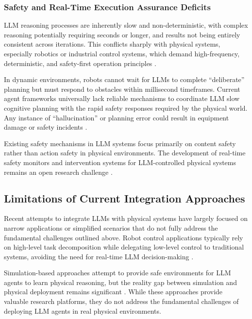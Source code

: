 \subsubsection{Safety and Real-Time Execution Assurance Deficits}

LLM reasoning processes are inherently slow and non-deterministic, with complex reasoning potentially requiring seconds or longer, and results not being entirely consistent across iterations. This conflicts sharply with physical systems, especially robotics or industrial control systems, which demand high-frequency, deterministic, and safety-first operation principles \cite{thrun2002probabilistic}.

In dynamic environments, robots cannot wait for LLMs to complete ``deliberate'' planning but must respond to obstacles within millisecond timeframes. Current agent frameworks universally lack reliable mechanisms to coordinate LLM slow cognitive planning with the rapid safety responses required by the physical world. Any instance of ``hallucination'' or planning error could result in equipment damage or safety incidents \cite{amodei2016concrete}.

Existing safety mechanisms in LLM systems focus primarily on content safety rather than action safety in physical environments. The development of real-time safety monitors and intervention systems for LLM-controlled physical systems remains an open research challenge \cite{pecka2014safe}.

\subsection{Limitations of Current Integration Approaches}

Recent attempts to integrate LLMs with physical systems have largely focused on narrow applications or simplified scenarios that do not fully address the fundamental challenges outlined above. Robot control applications typically rely on high-level task decomposition while delegating low-level control to traditional systems, avoiding the need for real-time LLM decision-making \cite{ahn2022saycan}.

Simulation-based approaches attempt to provide safe environments for LLM agents to learn physical reasoning, but the reality gap between simulation and physical deployment remains significant \cite{tobin2017domain}. While these approaches provide valuable research platforms, they do not address the fundamental challenges of deploying LLM agents in real physical environments.

